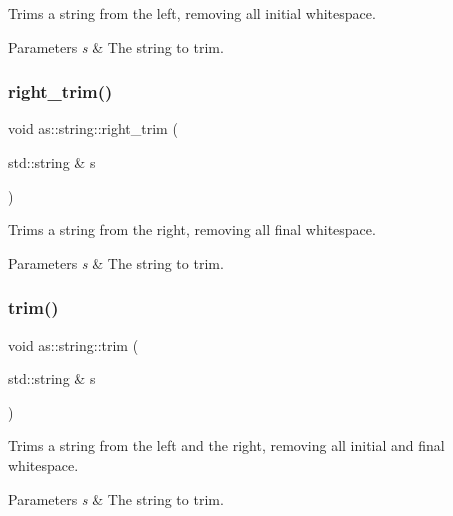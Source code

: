 Trims a string from the left, removing all initial whitespace. 


\begin{DoxyParams}{Parameters}
{\em s} & The string to trim. \\
\hline
\end{DoxyParams}
\mbox{\label{namespaceas_1_1string_a748afb440479e4824710ab07d92cbe68}} 
\subsubsection{\texorpdfstring{right\+\_\+trim()}{right\_trim()}}
{\footnotesize\ttfamily void as\+::string\+::right\+\_\+trim (\begin{DoxyParamCaption}\item[{std\+::string \&}]{s }\end{DoxyParamCaption})\hspace{0.3cm}{\ttfamily [inline]}}



Trims a string from the right, removing all final whitespace. 


\begin{DoxyParams}{Parameters}
{\em s} & The string to trim. \\
\hline
\end{DoxyParams}
\mbox{\label{namespaceas_1_1string_aa654dd12f0ebc738431eee149e2a8242}} 
\subsubsection{\texorpdfstring{trim()}{trim()}}
{\footnotesize\ttfamily void as\+::string\+::trim (\begin{DoxyParamCaption}\item[{std\+::string \&}]{s }\end{DoxyParamCaption})\hspace{0.3cm}{\ttfamily [inline]}}



Trims a string from the left and the right, removing all initial and final whitespace. 


\begin{DoxyParams}{Parameters}
{\em s} & The string to trim. \\
\hline
\end{DoxyParams}
